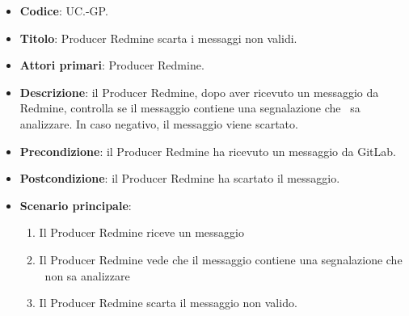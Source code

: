 	\begin{itemize}
		\item \textbf{Codice}: UC\theuccount.\thesubuccount-GP.
		\item \textbf{Titolo}: Producer Redmine scarta i messaggi non validi.
		\item \textbf{Attori primari}: Producer Redmine.
		\item \textbf{Descrizione}: il Producer Redmine, dopo aver ricevuto un messaggio da Redmine, controlla
		se il messaggio contiene una segnalazione che \progetto\ sa analizzare. In caso negativo, il messaggio viene scartato.
		\item \textbf{Precondizione}: il Producer Redmine ha ricevuto un messaggio da GitLab.
		\item \textbf{Postcondizione}: il Producer Redmine ha scartato il messaggio.
		\item \textbf{Scenario principale}: 
		\begin{enumerate}
			\item Il Producer Redmine riceve un messaggio
			\item Il Producer Redmine vede che il messaggio contiene una segnalazione che \progetto\ non sa analizzare
			\item Il Producer Redmine scarta il messaggio non valido.
		\end{enumerate}
	\end{itemize}